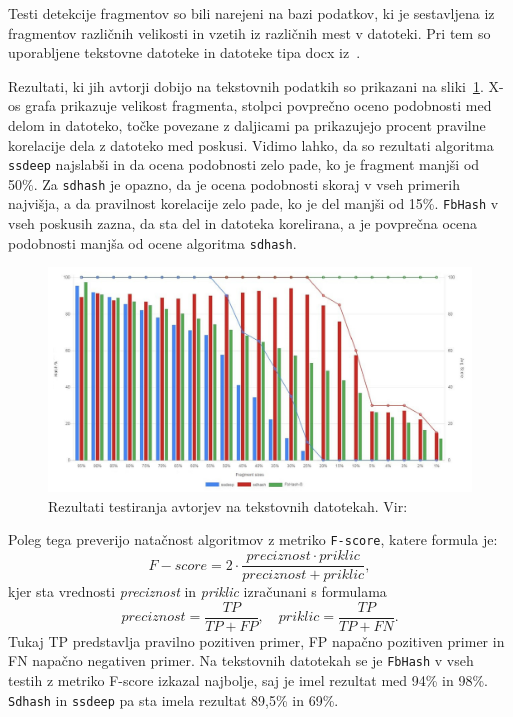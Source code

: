 \documentclass{acm_proc_article-sp}
\begin{document}
Testi detekcije fragmentov so bili narejeni na bazi podatkov, ki je sestavljena iz fragmentov različnih velikosti in vzetih iz različnih mest v datoteki. Pri tem so uporabljene tekstovne datoteke in datoteke tipa docx iz~\cite{zdataset}.

Rezultati, ki jih avtorji dobijo na tekstovnih podatkih so prikazani na sliki~\ref{fig:fd-rez}. X-os grafa prikazuje velikost fragmenta, stolpci povprečno oceno podobnosti med delom in datoteko, točke povezane z daljicami pa prikazujejo procent pravilne korelacije dela z datoteko med poskusi. Vidimo lahko, da so rezultati algoritma \texttt{ssdeep} najslabši in da ocena podobnosti zelo pade, ko je fragment manjši od 50\%. Za \texttt{sdhash} je opazno, da je ocena podobnosti skoraj v vseh primerih najvišja, a da pravilnost korelacije zelo pade, ko je del manjši od 15\%. \texttt{FbHash} v vseh poskusih zazna, da sta del in datoteka korelirana, a je povprečna ocena podobnosti manjša od ocene algoritma \texttt{sdhash}.  

\begin{figure}[htb]
\begin{center}
\includegraphics[width=1\columnwidth]{frag_det_text.png}
\end{center}
\caption{\small{Rezultati testiranja avtorjev na tekstovnih datotekah. Vir:~\cite{fbhash}}}
\label{fig:fd-rez}
\end{figure}

Poleg tega preverijo natačnost algoritmov z metriko  \texttt{F-score}, katere formula je:
\begin{displaymath} F-score = 2\cdot\frac{preciznost\cdot priklic}{preciznost + priklic},\end{displaymath} 
kjer sta vrednosti \textit{preciznost} in \textit{priklic} izračunani s formulama
\begin{displaymath} preciznost = \frac{TP}{TP + FP},\quad priklic = \frac{TP}{TP+FN}.\end{displaymath} 
Tukaj TP predstavlja pravilno pozitiven primer, FP napačno pozitiven primer in FN napačno negativen primer. Na tekstovnih datotekah se je \texttt{FbHash} v vseh testih z metriko F-score izkazal najbolje, saj je imel rezultat med 94\% in 98\%. \texttt{Sdhash} in \texttt{ssdeep} pa sta imela rezultat 89,5\% in 69\%.
\end{document}
